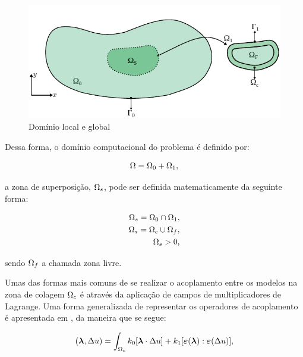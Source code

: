 \documentclass[tese_patricia]{subfiles}
\begin{document}
\begin{figure}[htb!]
	\centering 
	\includegraphics[scale=1.0,trim=0cm 0cm 0cm 0.0cm, clip=true]{Imagens/Cap6/dominioArlequin.pdf}	
	\caption{Domínio local e global}
	\label{fig:DomLocalGlobal}
\end{figure}

Dessa forma, o domínio computacional do problema é definido por:

\begin{align}
	\Omega = \Omega_0 + \Omega_1, \\
\end{align}

\noindent a zona de superposição, $\Omega_s$, pode ser definida matematicamente da seguinte forma:

\begin{align}
	\Omega_s = \Omega_0 \cap \Omega_1, \\
	\Omega_s = \Omega_c \cup \Omega_f, \\
	\Omega_s > 0, \\
\end{align}

\noindent sendo  $\Omega_f$ a chamada zona livre.

Umas das formas mais comuns de se realizar o acoplamento entre os modelos na zona de colagem $\Omega_c$ é através da aplicação de campos de multiplicadores de Lagrange. Uma forma generalizada de representar os operadores de acoplamento é apresentada em , da maneira que se segue:

\begin{align}
	(\boldsymbol{\lambda},\Delta u) =  \int_{\Omega_c} k_{0}[\boldsymbol{\lambda} \cdot \Delta u ] + k_{1}[\bm{\varepsilon} (\boldsymbol{\lambda}) : \bm{\varepsilon} (\Delta u)], \\
\end{align}
\end{document}
